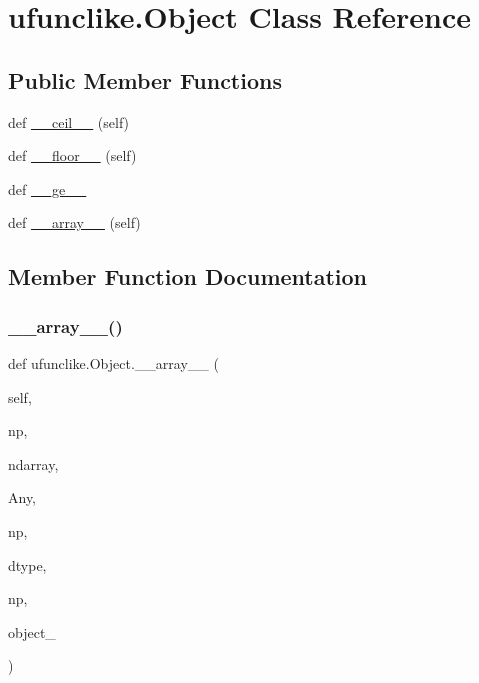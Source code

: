 \hypertarget{classufunclike_1_1Object}{}\section{ufunclike.\+Object Class Reference}
\label{classufunclike_1_1Object}
\subsection*{Public Member Functions}
\begin{DoxyCompactItemize}
\item 
def \hyperlink{classufunclike_1_1Object_a02709e272bb19535fe9a7f57a5972b3e}{\+\_\+\+\_\+ceil\+\_\+\+\_\+} (self)
\item 
def \hyperlink{classufunclike_1_1Object_a9e2d23cc5c5de1c33a9905a02acffb7d}{\+\_\+\+\_\+floor\+\_\+\+\_\+} (self)
\item 
def \hyperlink{classufunclike_1_1Object_af7d5484b114cf8efecd7759026fd84fa}{\+\_\+\+\_\+ge\+\_\+\+\_\+}
\item 
def \hyperlink{classufunclike_1_1Object_aec508597b57ce271cf83ee3c8a24898d}{\+\_\+\+\_\+array\+\_\+\+\_\+} (self)
\end{DoxyCompactItemize}


\subsection{Member Function Documentation}
\mbox{\label{classufunclike_1_1Object_aec508597b57ce271cf83ee3c8a24898d}} 
\subsubsection{\texorpdfstring{\+\_\+\+\_\+array\+\_\+\+\_\+()}{\_\_array\_\_()}}
{\footnotesize\ttfamily def ufunclike.\+Object.\+\_\+\+\_\+array\+\_\+\+\_\+ (\begin{DoxyParamCaption}\item[{}]{self,  }\item[{}]{np,  }\item[{}]{ndarray,  }\item[{}]{Any,  }\item[{}]{np,  }\item[{}]{dtype,  }\item[{}]{np,  }\item[{}]{object\+\_\+ }\end{DoxyParamCaption})}


